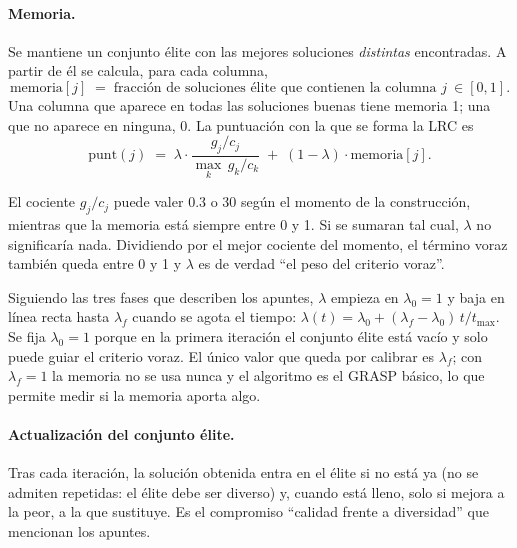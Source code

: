 \paragraph{Memoria.} Se mantiene un conjunto élite con las  mejores soluciones
\emph{distintas} encontradas. A partir de él se calcula, para cada columna,
\[
   \text{memoria}[j] \;=\; \text{fracción de soluciones élite que contienen la columna } j
   \ \in[0,1].
\]
Una columna que aparece en todas las soluciones buenas tiene memoria 1; una que no aparece en
ninguna, 0. La puntuación con la que se forma la LRC es
\begin{equation}\label{eq:grasp}
   \text{punt}(j) \;=\; \lambda\cdot\frac{g_j/c_j}{\max_k\, g_k/c_k}
                 \;+\;(1-\lambda)\cdot\text{memoria}[j].
\end{equation}

\begin{decision}
El cociente $g_j/c_j$ puede valer 0.3 o 30 según el momento de la construcción, mientras que
la memoria está siempre entre 0 y 1. Si se sumaran tal cual, $\lambda$ no significaría nada.
Dividiendo por el mejor cociente del momento, el término voraz también queda entre 0 y 1 y
$\lambda$ es de verdad ``el peso del criterio voraz''.
\end{decision}

\begin{decision}
Siguiendo las tres fases que describen los apuntes, $\lambda$ empieza en $\lambda_0=1$ y baja
en línea recta hasta $\lambda_f$ cuando se agota el tiempo:
$\lambda(t)=\lambda_0+(\lambda_f-\lambda_0)\,t/t_{\max}$. Se fija $\lambda_0=1$ porque en la
primera iteración el conjunto élite está vacío y solo puede guiar el criterio voraz. El
único valor que queda por calibrar es $\lambda_f$; con $\lambda_f=1$ la memoria no se usa
nunca y el algoritmo es el GRASP básico, lo que permite medir si la memoria aporta algo.
\end{decision}

\paragraph{Actualización del conjunto élite.} Tras cada iteración, la solución obtenida
entra en el élite si no está ya (no se admiten repetidas: el élite debe ser diverso) y,
cuando está lleno, solo si mejora a la peor, a la que sustituye. Es el compromiso ``calidad
frente a diversidad'' que mencionan los apuntes.

